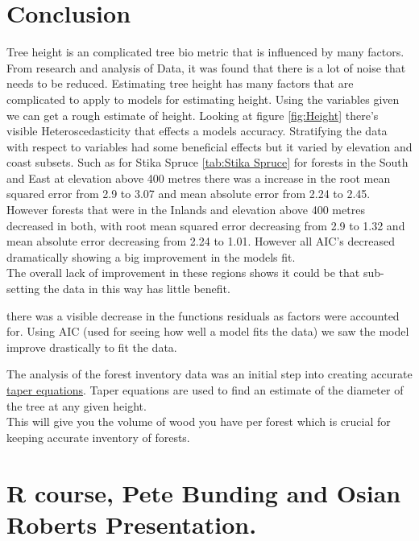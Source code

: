 \documentclass[a4paper,11pt,twoside]{report}
\begin{document}
\chapter{Conclusion}
Tree height is an complicated tree bio metric that is influenced by many factors. From research and analysis of Data, it was found that there is a lot of noise that needs to be reduced. Estimating tree height has many factors that are complicated to apply to models for estimating height. Using the variables given we can get a rough estimate of height. Looking at figure \ref{fig:Height} there's visible Heteroscedasticity that effects a models accuracy. Stratifying the data with respect to variables had some beneficial effects but it varied by elevation and coast subsets. Such as for Stika Spruce \ref{tab:Stika Spruce} for forests in the South and East at elevation above 400 metres there was a increase in the root mean squared error from 2.9 to 3.07 and mean absolute error from 2.24 to 2.45. However forests that were in the Inlands and elevation above 400 metres decreased in both, with root mean squared error decreasing from 2.9 to 1.32 and mean absolute error decreasing from 2.24 to 1.01. However all AIC's decreased dramatically showing a big improvement in the models fit.\\
The overall lack of improvement in these regions shows it could be that sub-setting the data in this way has little benefit.   

there was a visible decrease in the functions residuals as factors were accounted for. 
Using AIC (used for seeing how well a model fits the data) we saw the model improve drastically to fit the data.

\par

The analysis of the forest inventory data was an initial step into creating accurate \href{https://www.fs.fed.us/nrs/pubs/gtr/gtr-nrs-p-167papers/27-larsen_2016-CHFC.pdf}{taper equations}. Taper equations are used to find an estimate of the diameter of the tree at any given height.\\
This will give you the volume of wood you have per forest which is crucial for keeping accurate inventory of forests. 



\chapter{R course, Pete Bunding and Osian Roberts Presentation.}
\end{document}
